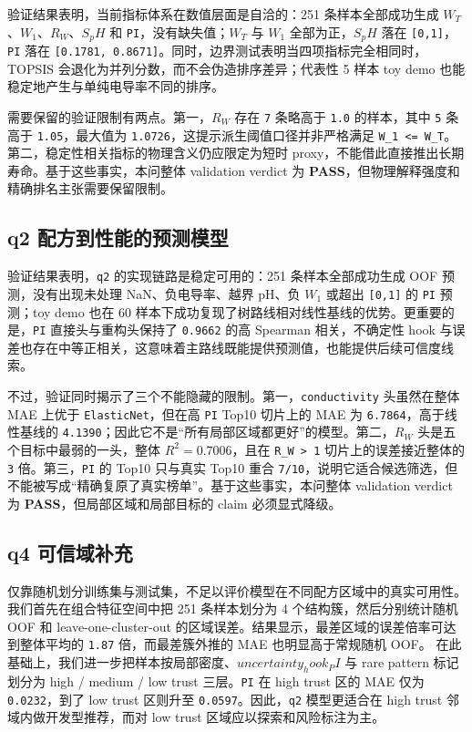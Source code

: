 \documentclass[bwprint]{gmcmthesis}
\numberwithin{figure}{section}
\begin{document}
验证结果表明，当前指标体系在数值层面是自洽的：251 条样本全部成功生成 $W_T$、$W_1$、$R_W$、$S_pH$ 和 \texttt{PI}，没有缺失值；$W_T$ 与 $W_1$ 全部为正，$S_pH$ 落在 \texttt{[0,1]}，\texttt{PI} 落在 \texttt{[0.1781, 0.8671]}。同时，边界测试表明当四项指标完全相同时，TOPSIS 会退化为并列分数，而不会伪造排序差异；代表性 5 样本 toy demo 也能稳定地产生与单纯电导率不同的排序。\par

需要保留的验证限制有两点。第一，$R_W$ 存在 \texttt{7} 条略高于 \texttt{1.0} 的样本，其中 \texttt{5} 条高于 \texttt{1.05}，最大值为 \texttt{1.0726}，这提示派生阈值口径并非严格满足 \texttt{W\_1 <= W\_T}。第二，稳定性相关指标的物理含义仍应限定为短时 proxy，不能借此直接推出长期寿命。基于这些事实，本问整体 validation verdict 为 \textbf{PASS}，但物理解释强度和精确排名主张需要保留限制。\par

\subsection{q2 配方到性能的预测模型}

验证结果表明，\texttt{q2} 的实现链路是稳定可用的：251 条样本全部成功生成 OOF 预测，没有出现未处理 NaN、负电导率、越界 pH、负 $W_1$ 或超出 \texttt{[0,1]} 的 \texttt{PI} 预测；toy demo 也在 60 样本下成功复现了树路线相对线性基线的优势。更重要的是，\texttt{PI} 直接头与重构头保持了 \texttt{0.9662} 的高 Spearman 相关，不确定性 hook 与误差也存在中等正相关，这意味着主路线既能提供预测值，也能提供后续可信度线索。\par

不过，验证同时揭示了三个不能隐藏的限制。第一，\texttt{conductivity} 头虽然在整体 MAE 上优于 \texttt{ElasticNet}，但在高 \texttt{PI} Top10 切片上的 MAE 为 \texttt{6.7864}，高于线性基线的 \texttt{4.1390}；因此它不是“所有局部区域都更好”的模型。第二，$R_W$ 头是五个目标中最弱的一头，整体 $R^2 = 0.7006$，且在 \texttt{R\_W > 1} 切片上的误差接近整体的 \texttt{3} 倍。第三，\texttt{PI} 的 Top10 只与真实 Top10 重合 \texttt{7/10}，说明它适合候选筛选，但不能被写成“精确复原了真实榜单”。基于这些事实，本问整体 validation verdict 为 \textbf{PASS}，但局部区域和局部目标的 claim 必须显式降级。\par

\subsection{q4 可信域补充}

仅靠随机划分训练集与测试集，不足以评价模型在不同配方区域中的真实可用性。我们首先在组合特征空间中把 251 条样本划分为 4 个结构簇，然后分别统计随机 OOF 和 leave-one-cluster-out 的区域误差。结果显示，最差区域的误差倍率可达到整体平均的 \texttt{1.87} 倍，而最差簇外推的 MAE 也明显高于常规随机 OOF。 在此基础上，我们进一步把样本按局部密度、$uncertainty_hook_PI$ 与 rare pattern 标记划分为 high / medium / low trust 三层。\texttt{PI} 在 high trust 区的 MAE 仅为 \texttt{0.0232}，到了 low trust 区则升至 \texttt{0.0597}。因此，\texttt{q2} 模型更适合在 high trust 邻域内做开发型推荐，而对 low trust 区域应以探索和风险标注为主。\par
\end{document}
